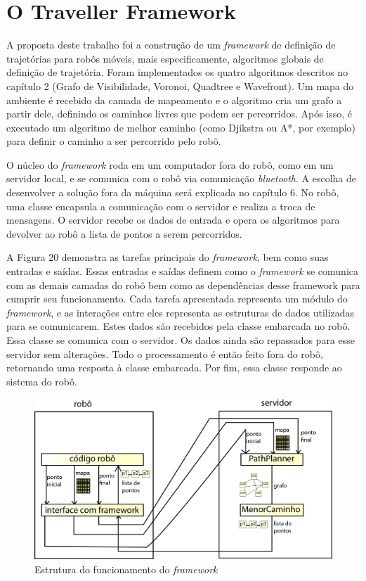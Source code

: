 \chapter[O Traveller Framework]{O Traveller Framework}

A proposta deste trabalho foi a construção de um \textit{framework} de definição de trajetórias para robôs móveis, mais especificamente, algoritmos globais de definição de trajetória. Foram implementados os quatro algoritmos descritos no capítulo 2 (Grafo de Visibilidade, Voronoi, Quadtree e Wavefront). Um mapa do ambiente é recebido da camada de mapeamento e o algoritmo cria um grafo a partir dele, definindo os caminhos livres que podem ser percorridos. Após isso, é executado um algoritmo de melhor caminho (como Djikstra ou A*, por exemplo) para definir o caminho a ser percorrido pelo robô. 

O núcleo do \textit{framework} roda em um computador fora do robô, como em um servidor local, e se comunica com o robô via comunicação \textit{bluetooth}. A escolha de desenvolver a solução fora da máquina será explicada no capítulo 6. No robô, uma classe encapsula a comunicação com o servidor e realiza a troca de mensagens. O servidor recebe os dados de entrada e opera os algoritmos para devolver ao robô a lista de pontos a serem percorridos.

A Figura 20 demonstra as tarefas principais do \textit{framework}, bem como suas entradas e saídas. Essas entradas e saídas definem como o \textit{framework} se comunica com as demais camadas do robô bem como as dependências desse framework para cumprir seu funcionamento. Cada tarefa apresentada representa um módulo do \textit{framework}, e as interações entre eles representa as estruturas de dados utilizadas para se comunicarem. Estes dados são recebidos pela classe embarcada no robô. Essa classe se comunica com o servidor. Os dados ainda são repassados para esse servidor sem alterações. Todo o processamento é então feito fora do robô, retornando uma resposta à classe embarcada. Por fim, essa classe responde ao sistema do robô.
 
\begin{figure}[h]
	\centering
	\label{fig20}
		\includegraphics[keepaspectratio=true,scale=0.9]{figuras/framework.png}
	\caption{Estrutura do funcionamento do \textit{framework}}
\end{figure} 

